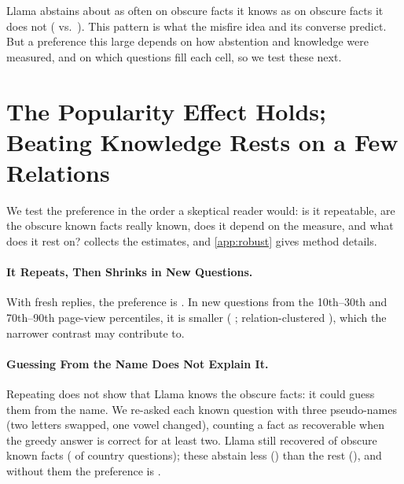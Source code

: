 \documentclass[manuscript,screen,review,anonymous,nonacm]{acmart}
\begin{document}
Llama abstains about as often on obscure facts it knows as on obscure facts it does not (\tcObsKnownAbs{} vs.\ \tcObsUnkAbs). This pattern is what the misfire idea and its converse predict. But a preference this large depends on how abstention and knowledge were measured, and on which questions fill each cell, so we test these next.

\section{The Popularity Effect Holds; Beating Knowledge Rests on a Few Relations}
\label{sec:holds}

We test the preference in the order a skeptical reader would: is it repeatable, are the obscure known facts really known, does it depend on the measure, and what does it rest on?  collects the estimates, and \cref{app:robust} gives method details.

\paragraph{It Repeats, Then Shrinks in New Questions.} With fresh replies, the preference is \frDiff{} \frDiffCI. In new questions from the 10th--30th and 70th--90th page-view percentiles, it is smaller (\nqDiff{} \nqDiffCI; relation-clustered \nqClusCI), which the narrower contrast may contribute to.

\paragraph{Guessing From the Name Does Not Explain It.} Repeating does not show that Llama knows the obscure facts: it could guess them from the name. We re-asked each known question with three pseudo-names (two letters swapped, one vowel changed), counting a fact as recoverable when the greedy answer is correct for at least two. Llama still recovered \ncObsRec{} of \ncObsProbed{} obscure known facts (\ncCountryRec{} of \ncCountryN{} country questions); these abstain less (\ncRecAbs) than the rest (\ncOtherAbs), and without them the preference is \ncDiff{} \ncDiffCI.
\end{document}
